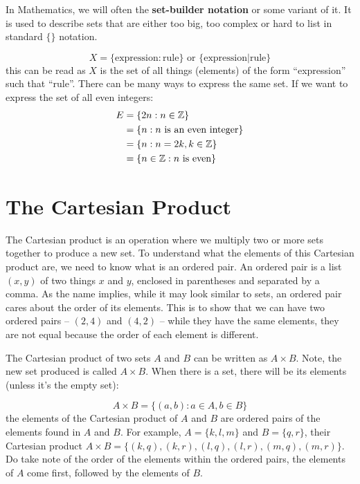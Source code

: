 \documentclass[../Latex-Setup/setup.tex]{subfiles}
\begin{document}
\indent In Mathematics, we will often the \textbf{set-builder notation} or some variant of it.
It is used to describe sets that are either too big, too complex or hard to list in standard $\{\}$ notation.

\[X = \{\text{expression}:\text{rule}\} \text{ or } \{\text{expression}|\text{rule}\}\]
this can be read as $X$ is the set of all things (elements) of the form ``expression'' such that ``rule''.
There can be many ways to express the same set. If we want to express the set of all even integers:
\begin{align*}
    E &= \{2n: n \in \mathbb Z\} \\
    &= \{n: n \text{ is an even integer}\} \\
    &= \{n: n=2k,k \in \mathbb Z\} \\
    &= \{n \in \mathbb{Z} : n \text{ is even}\}
\end{align*}
\par


\section{The Cartesian Product}

The Cartesian product is an operation where we multiply two or more sets together to produce a new set.
To understand what the elements of this Cartesian product are, we need to know what is an ordered pair.
An ordered pair is a list $(x,y)$ of two things $x$ and $y$, enclosed in parentheses and separated by a comma.
As the name implies, while it may look similar to sets, an ordered pair cares about the order of its elements.
This is to show that we can have two ordered pairs -- $(2,4)$ and $(4,2)$ -- while they have the same elements,
they are not equal because the order of each element is different.\par

The Cartesian product of two sets $A$ and $B$ can be written as $A \times B$. Note, the new set produced is called $A \times B$.
When there is a set, there will be its elements (unless it's the empty set):

\[A \times B =\{(a, b) : a \in A, b \in B\}\]
the elements of the Cartesian product of $A$ and $B$ are ordered pairs of the elements found in $A$ and $B$. For example,
$A = \{k, l, m\}$ and $B = \{q, r\}$, their Cartesian product $A \times B = \{(k,q), (k,r), (l,q), (l,r), (m,q), (m,r)\}$.
Do take note of the order of the elements within the ordered pairs, the elements of $A$ come first, followed by the elements of $B$.\par
\end{document}
